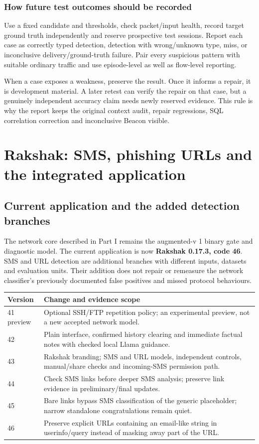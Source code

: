 \documentclass[11pt,a4paper,oneside]{report}
\begin{document}
\section{How future test outcomes should be recorded}
Use a fixed candidate and thresholds, check packet/input health, record target ground truth independently and reserve prospective test sessions. Report each case as correctly typed detection, detection with wrong/unknown type, miss, or inconclusive delivery/ground-truth failure. Pair every suspicious pattern with suitable ordinary traffic and use episode-level as well as flow-level reporting.

When a case exposes a weakness, preserve the result. Once it informs a repair, it is development material. A later retest can verify the repair on that case, but a genuinely independent accuracy claim needs newly reserved evidence. This rule is why the report keeps the original context audit, repair regressions, SQL correlation correction and inconclusive Beacon visible.

\part{Rakshak: SMS, phishing URLs and the integrated application}
\chapter{Current application and the added detection branches}
The network core described in Part I remains the augmented-v 1 binary gate and diagnostic model. The current application is now \textbf{Rakshak 0.17.3, code 46}. SMS and URL detection are additional branches with different inputs, datasets and evaluation units. Their addition does not repair or remeasure the network classifier's previously documented false positives and missed protocol behaviours.

\begin{longtable}{@{}lp{}@{}}
\toprule Version & Change and evidence scope\\\midrule\endhead
41 preview & Optional SSH/FTP repetition policy; an experimental preview, not a new accepted network model.\\
42 & Plain interface, confirmed history clearing and immediate factual notes with checked local Llama guidance.\\
43 & Rakshak branding; SMS and URL models, independent controls, manual/share checks and incoming-SMS permission path.\\
44 & Check SMS links before deeper SMS analysis; preserve link evidence in preliminary/final updates.\\
45 & Bare links bypass SMS classification of the generic placeholder; narrow standalone congratulations remain quiet.\\
46 & Preserve explicit URLs containing an email-like string in userinfo/query instead of masking away part of the URL.\\
\bottomrule\end{longtable}
\end{document}

